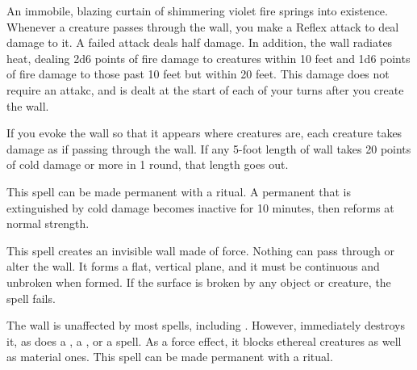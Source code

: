 \spelldur{\durshort}
\begin{spelleffect}
    An immobile, blazing curtain of shimmering violet fire springs into existence. Whenever a creature passes through the wall, you make a Reflex attack to deal damage to it. A failed attack deals half damage. In addition, the wall radiates heat, dealing 2d6 points of fire damage to creatures within 10 feet and 1d6 points of fire damage to those past 10 feet but within 20 feet. This damage does not require an attakc, and is dealt at the start of each of your turns after you create the wall.
    \par If you evoke the wall so that it appears where creatures are, each creature takes damage as if passing through the wall. If any 5-foot length of wall takes 20 points of cold damage or more in 1 round, that length goes out.
\end{spelleffect}
\begin{spellnotes}
    This spell can be made permanent with a  ritual. A permanent  that is extinguished by cold damage becomes inactive for 10 minutes, then reforms at normal strength.
\end{spellnotes}

\spelldur{\durshort \dismissable}
\begin{spelleffect}
    This spell creates an invisible wall made of force. Nothing can pass through or alter the wall. It forms a flat, vertical plane, and it must be continuous and unbroken when formed. If the surface is broken by any object or creature, the spell fails.
\end{spelleffect}
\begin{spellnotes}
    The wall is unaffected by most spells, including . However,  immediately destroys it, as does a , a , or a  spell. As a force effect, it blocks ethereal creatures as well as material ones.
    This spell can be made permanent with a  ritual.
\end{spellnotes}

